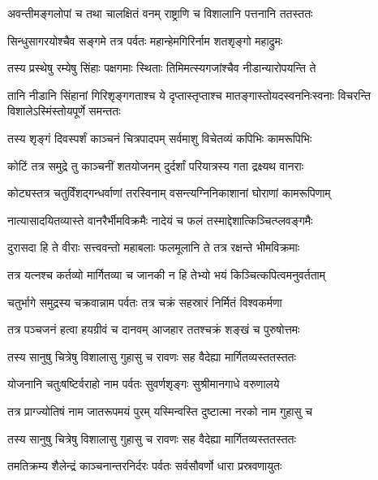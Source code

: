 \twolineshloka
{अवन्तीमङ्गलोपां च तथा चालक्षितं वनम्}
{राष्ट्राणि च विशालानि पत्तनानि ततस्ततः} %

\twolineshloka
{सिन्धुसागरयोश्चैव सङ्गमे तत्र पर्वतः}
{महान्हेमगिरिर्नाम शतशृङ्गो महाद्रुमः} %

\twolineshloka
{तस्य प्रस्थेषु रम्येषु सिंहाः पक्षगमाः स्थिताः}
{तिमिमत्स्यगजांश्चैव नीडान्यारोपयन्ति ते} %

\threelineshloka
{तानि नीडानि सिंहानां गिरिशृङ्गगताश्च ये}
{दृप्तास्तृप्ताश्च मातङ्गास्तोयदस्वननिःस्वनाः}
{विचरन्ति विशालेऽस्मिंस्तोयपूर्णे समन्ततः} %

\twolineshloka
{तस्य शृङ्गं दिवस्पर्शं काञ्चनं चित्रपादपम्}
{सर्वमाशु विचेतव्यं कपिभिः कामरूपिभिः} %

\twolineshloka
{कोटिं तत्र समुद्रे तु काञ्चनीं शतयोजनम्}
{दुर्दर्शां परियात्रस्य गता द्रक्ष्यथ वानराः} %

\twolineshloka
{कोट्यस्तत्र चतुर्विंशद्गन्धर्वाणां तरस्विनाम्}
{वसन्त्यग्निनिकाशानां घोराणां कामरूपिणाम्} %

\twolineshloka
{नात्यासादयितव्यास्ते वानरैर्भीमविक्रमैः}
{नादेयं च फलं तस्माद्देशात्किञ्चित्प्लवङ्गमैः} %

\twolineshloka
{दुरासदा हि ते वीराः सत्त्ववन्तो महाबलाः}
{फलमूलानि ते तत्र रक्षन्ते भीमविक्रमाः} %

\twolineshloka
{तत्र यत्नश्च कर्तव्यो मार्गितव्या च जानकी}
{न हि तेभ्यो भयं किञ्चित्कपित्वमनुवर्तताम्} %

\twolineshloka
{चतुर्भागे समुद्रस्य चक्रवान्नाम पर्वतः}
{तत्र चक्रं सहस्रारं निर्मितं विश्वकर्मणा} %

\twolineshloka
{तत्र पञ्चजनं हत्वा हयग्रीवं च दानवम्}
{आजहार ततश्चक्रं शङ्खं च पुरुषोत्तमः} %

\twolineshloka
{तस्य सानुषु चित्रेषु विशालासु गुहासु च}
{रावणः सह वैदेह्या मार्गितव्यस्ततस्ततः} %

\twolineshloka
{योजनानि चतुःषष्टिर्वराहो नाम पर्वतः}
{सुवर्णशृङ्गः सुश्रीमानगाधे वरुणालये} %

\twolineshloka
{तत्र प्राग्ज्योतिषं नाम जातरूपमयं पुरम्}
{यस्मिन्वस्ति दुष्टात्मा नरको नाम गुहासु च} %

\twolineshloka
{तस्य सानुषु चित्रेषु विशालासु गुहासु च}
{रावणः सह वैदेह्या मार्गितव्यस्ततस्ततः} %

\twolineshloka
{तमतिक्रम्य शैलेन्द्रं काञ्चनान्तरनिर्दरः}
{पर्वतः सर्वसौवर्णो धारा प्रस्रवणायुतः} %


